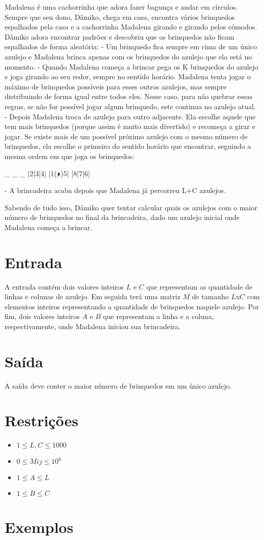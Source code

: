 Madalena é uma cachorrinha que adora fazer bagunça e andar em círculos. Sempre que seu dono, Dâmiko, chega em casa, encontra vários brinquedos espalhados pela casa e a cachorrinha Madalena girando e girando pelos cômodos.
Dâmiko adora encontrar padrões e descobriu que os brinquedos não ficam espalhados de forma aleatória:
- Um brinquedo fica sempre em cima de um único azulejo e Madalena brinca apenas com os brinquedos do azulejo que ela está no momento.
- Quando Madalena começa a brincar pega os K brinquedos do azulejo e joga girando ao seu redor, sempre no sentido horário.
Madalena tenta jogar o máximo de brinquedos possíveis para esses outros azulejos, mas sempre distribuindo de forma igual entre todos eles. Nesse caso, para não quebrar essas regras, se não for possível jogar algum brinquedo, este continua no azulejo atual.
- Depois Madalena troca de azulejo para outro adjacente. Ela escolhe aquele que tem mais brinquedos (porque assim é muito mais divertido) e recomeça a girar e jogar. Se existe mais de um possível próximo azulejo com o mesmo número de brinquedos, ela escolhe o primeiro do sentido horário que encontrar, seguindo a mesma ordem em que joga os brinquedos:

 _ _ _
|2|3|4|
|1(ᴥ)5|
|8|7|6|

- A brincadeira acaba depois que Madalena já percorreu L+C azulejos.

Sabendo de tudo isso, Dâmiko quer tentar calcular quais os azulejos com o maior número de brinquedos no final da brincadeira, dado um azulejo inicial onde Madalena começa a brincar.

\section*{Entrada}

A entrada contém dois valores inteiros $L$ e $C$ que representam as quantidade de linhas e colunas de azulejo. Em seguida terá uma matriz $M$ de tamanho $L$x$C$ com elementos inteiros representando a quantidade de brinquedos naquele azulejo.
Por fim, dois valores inteiros $A$ e $B$ que representam a linha e a coluna, respectivamente, onde Madalena iniciou sua brincadeira.

\section*{Saída}

A saída deve conter o maior número de brinquedos em um único azulejo.


\section*{Restrições}

\begin{itemize}
\item $1 \leq L, C \leq 1000$
\item $0 \leq Mij \leq 10^6$
\item $1 \leq A \leq L$
\item $1 \leq B \leq C$
\end{itemize}


\section*{Exemplos}

\exemplo

